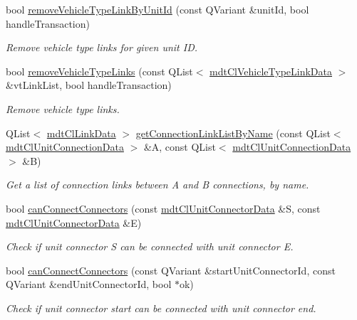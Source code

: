 \begin{DoxyCompactItemize}
bool \hyperlink{classmdt_cl_link_a44d152cef5aeb95a150335b225276892}{remove\-Vehicle\-Type\-Link\-By\-Unit\-Id} (const Q\-Variant \&unit\-Id, bool handle\-Transaction)
\begin{DoxyCompactList}\small\item\em Remove vehicle type links for given unit I\-D. \end{DoxyCompactList}\item 
bool \hyperlink{classmdt_cl_link_a6b3e1de445d4c70c057ff89df193854f}{remove\-Vehicle\-Type\-Links} (const Q\-List$<$ \hyperlink{classmdt_cl_vehicle_type_link_data}{mdt\-Cl\-Vehicle\-Type\-Link\-Data} $>$ \&vt\-Link\-List, bool handle\-Transaction)
\begin{DoxyCompactList}\small\item\em Remove vehicle type links. \end{DoxyCompactList}\item 
Q\-List$<$ \hyperlink{classmdt_cl_link_data}{mdt\-Cl\-Link\-Data} $>$ \hyperlink{classmdt_cl_link_a13c49a669e9e5a7d228aeb6a238c8633}{get\-Connection\-Link\-List\-By\-Name} (const Q\-List$<$ \hyperlink{classmdt_cl_unit_connection_data}{mdt\-Cl\-Unit\-Connection\-Data} $>$ \&A, const Q\-List$<$ \hyperlink{classmdt_cl_unit_connection_data}{mdt\-Cl\-Unit\-Connection\-Data} $>$ \&B)
\begin{DoxyCompactList}\small\item\em Get a list of connection links between A and B connections, by name. \end{DoxyCompactList}\item 
bool \hyperlink{classmdt_cl_link_aaf6e10edf75e8228e69d4992dbd9cb42}{can\-Connect\-Connectors} (const \hyperlink{classmdt_cl_unit_connector_data}{mdt\-Cl\-Unit\-Connector\-Data} \&S, const \hyperlink{classmdt_cl_unit_connector_data}{mdt\-Cl\-Unit\-Connector\-Data} \&E)
\begin{DoxyCompactList}\small\item\em Check if unit connector S can be connected with unit connector E. \end{DoxyCompactList}\item 
bool \hyperlink{classmdt_cl_link_a54a51f45691831615c4c4c1b0bf30367}{can\-Connect\-Connectors} (const Q\-Variant \&start\-Unit\-Connector\-Id, const Q\-Variant \&end\-Unit\-Connector\-Id, bool $\ast$ok)
\begin{DoxyCompactList}\small\item\em Check if unit connector start can be connected with unit connector end. \end{DoxyCompactList}\item 

\end{DoxyCompactItemize}
